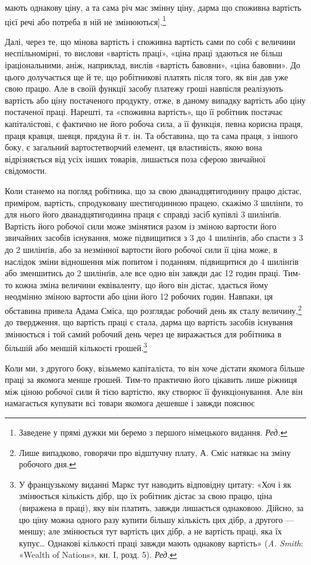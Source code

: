 \parcont{}  %
мають однакову ціну, а та сама річ має змінну ціну, дарма що
споживна вартість цієї речі або потреба в ній не змінюються].\footnote*{
Заведене у прямі дужки ми беремо з першого німецького видання. \emph{Ред.}
}

Далі, через те, що мінова вартість і споживна вартість сами
по собі є величини неспільномірні, то вислови «вартість праці»,
«ціна праці здаються не більш іраціональними, аніж, наприклад,
вислів «вартість бавовни», «ціна бавовни». До цього долучається
ще й те, що робітникові платять після того, як він дав
уже свою працю. Але в своїй функції засобу платежу гроші
навпісля реалізують вартість або ціну постаченого продукту,
отже, в даному випадку вартість або ціну постаченої праці.
Нарешті, та «споживна вартість», що її робітник постачає капіталістові,
є фактично не його робоча сила, а її функція, певна
корисна праця, праця кравця, шевця, прядуна й т. ін. Та обставина,
що та сама праця, з іншого боку, є загальний вартостетворчий
елемент, ця властивість, якою вона відрізняється від усіх
інших товарів, лишається поза сферою звичайної свідомости.

Коли станемо на погляд робітника, що за свою дванадцятигодинну
працю дістає, приміром, вартість, спродуковану шестигодинною
працею, скажімо 3 шилінґи, то для нього його дванадцятигодинна
праця є справді засіб купівлі 3 шилінґів. Вартість
його робочої сили може змінятися разом із зміною вартости його
звичайних засобів існування, може підвищитися з 3 до 4 шилінґів,
або спасти з 3 до 2 шилінґів, або за незмінної вартости його робочої
сили її ціна може, в наслідок зміни відношення між попитом
і поданням, підвищитися до 4 шилінґів або зменшитись до 2 шилінґів,
але все одно він завжди дає 12 годин праці. Тим-то кожна
зміна величини еквіваленту, що його він дістає, здається йому
неодмінно зміною вартости або ціни його 12 робочих годин.
Навпаки, ця обставина привела Адама Сміса, що розглядає
робочий день як сталу величину,\footnote{
Лише випадково, говорячи про відштучну плату, А. Сміс натякає
на зміну робочого дня.
} до твердження, що вартість
праці є стала, дарма що вартість засобів існування змінюється
і той самий робочий день через це виражається для робітника
в більшій або меншій кількості грошей.\footnote*{
У французькому виданні Маркс тут наводить відповідну цитату:
«Хоч і як змінюється кількість дібр, що їх робітник дістає за свою
працю, ціна (виражена в праці), яку він платить, завжди лишається
однаковою. Дійсно, за цю ціну можна одного разу купити більшу кількість
цих дібр, а другого — меншу; але змінюється тут вартість цих
дібр, а не вартість праці, яка їх купує\dots{} Однакові кількості праці
завжди мають однакову вартість» (\emph{A. Smith}: «Wealth of Nations», кн. I,
розд. 5). \emph{Ред.}
}

Коли ми, з другого боку, візьмемо капіталіста, то він хоче
дістати якомога більше праці за якомога менше грошей. Тим-то
практично його цікавить лише ріжниця між ціною робочої сили
й тією вартістю, яку створює її функціонування. Але він намагається
купувати всі товари якомога дешевше і завжди пояснює
\parbreak{}  %
